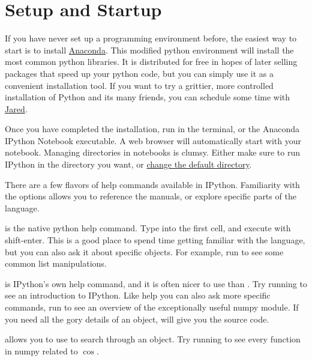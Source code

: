 \documentclass[justified, nobib]{tufte-handout}
\makeatletter
\newcommand{\anacondaLink}{https://store.continuum.io/cshop/anaconda/}
\newcommand{\email}{mailto:jgarst@ucdavis.edu}
\newcommand{\customizeDirectoryLink}
  {http://stackoverflow.com/questions/15680463/change-ipython-working-directory}
\makeatother
\begin{document}
\section*{Setup and Startup}
If you have never set up a programming environment before, the easiest way to
start is to install \href{\anacondaLink}{Anaconda}.
This modified python environment will install the most common python libraries.
It is distributed for free in hopes of later selling packages that speed up
your python code, but you can simply use it as a convenient installation tool.
If you want to try a grittier, more controlled installation of Python and its
many friends, you can schedule some time with \href{\email}{Jared}.

\smallskip
\noindent
Once you have completed the installation, run  in
the terminal, or the Anaconda IPython Notebook executable.
A web browser will automatically start with your notebook.
Managing directories in notebooks is clumsy.
Either make sure to run IPython in the directory you want, or
\href{\customizeDirectoryLink}{change the default directory}.

\smallskip
\noindent
There are a few flavors of help commands available in IPython. Familiarity with
the options allows you to reference the manuals, or explore specific parts of
the language.


 is the native python help command.
  Type  into the first cell, and execute with
  shift-enter.
  This is a good place to spend time getting familiar with the language, but
  you can also ask it about specific objects.
  For example, run  to see some common list
  manipulations.

 is IPython's own help command, and it is often nicer
  to use than .
  Try running  to see an introduction to IPython.
  Like help you can also ask more specific commands, run
   to see an overview of the exceptionally
  useful numpy module.
  If you need all the gory details of an object,  will
  give you the source code.

 allows you to use
   to search through an object.
  Try running  to see every
  function in numpy related to $\cos$.
\end{document}
